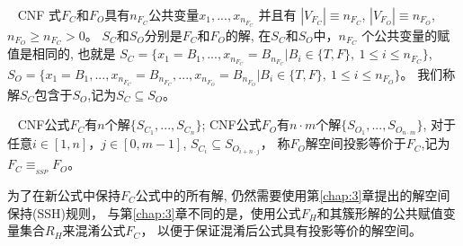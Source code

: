 \begin{definition}~
CNF 式$F_C$和$F_O$具有$n_{F_C}$公共变量$x_1,...,x_{n_{F_C}}$ 并且有
$|V_{F_C}|\equiv n_{F_C}$, $|V_{F_O}|\equiv n_{F_O}$, $ n_{F_O}\geqslant n_{F_C} > 0$。
$S_C$和$S_O$分别是$F_C$和$F_O$的解,
在$S_C$和$S_O$中，$n_{F_C}$ 个公共变量的赋值是相同的, 也就是
$S_C=\{x_1=B_1,...,x_{n_{F_C}}=B_{n_{F_C}} | B_i \in \{T,F\},~1\leqslant i\leqslant n_{F_C} \}$,
$S_O=\{x_1=B_1,...,x_{n_{F_C}}=B_{n_{F_C}},...,x_{n_{F_O}}=B_{n_{F_O}}|B_i\in \{T,F\},~ 1\leqslant i\leqslant n_{F_O} \}$。
我们称解$S_C$包含于$S_O$,记为$S_C\subseteq S_O$。
\end{definition}


\begin{definition}\label{4:SSPdefinition}~
CNF公式$F_C$有$n$个解$\{S_{C_1},...,S_{C_n}\}$;
CNF公式$F_O$有$n \cdot m$个解$\{S_{O_1},...,S_{O_{n \cdot m}}\}$,
对于任意$i \in [1,n]，j \in [0,m-1]$, $S_{C_i} \subseteq S_{O_{i + {n \cdot j}}}$，
称$F_O$解空间投影等价于$F_C$,记为$F_C \equiv_{_{SSP}} F_O$。
\end{definition}

为了在新公式中保持$F_C$公式中的所有解,
仍然需要使用第\ref{chap:3}章提出的解空间保持(SSH)规则，
与第\ref{chap:3}章不同的是，使用公式$F_H$和其簇形解的公共赋值变量集合$R_H$来混淆公式$F_C$，
以便于保证混淆后公式具有投影等价的解空间。

